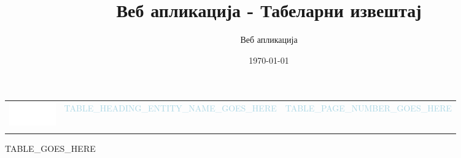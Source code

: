 \documentclass{article}
\title{Веб апликација - Табеларни извештај}
\author{Веб апликација}
\date{\today}
\begin{document}
\pagestyle{fancyplain}
\fancyhf{}
\rhead{ \fancyplain{}{\today} }
\rfoot{ \fancyplain{}{\thepage} }

\sffamily


\noindent

\begin{longtable}{ L{20mm} C{110mm} C{30mm} }
  \textcolor{white}{\includegraphics[width=20mm]{logo}} &
  \textcolor{lightblue}{\Huge{TABLE_HEADING_ENTITY_NAME_GOES_HERE}} &
  \textcolor{lightblue}{TABLE_PAGE_NUMBER_GOES_HERE} \\
   &  & \\
\end{longtable}

TABLE_GOES_HERE
\end{document}
